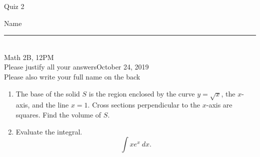 \documentclass[12pt]{article}
\begin{document}
\begin{flushleft} 
\centerline{\LARGE{Quiz 2}} 
\vspace{5 mm}
{Name \rule {2 in}{0.01in}}\\
Math 2B, 12PM
\\
{Please justify all your answers}\hfill {October 24, 2019}
\\
{Please also write your full name on the back} 

\medskip
\end{flushleft}
\begin{enumerate}
	\item The base of the solid $S$ is the region enclosed by the curve $y = \sqrt{x}$, the $x$-axis, and the line $x = 1$. Cross sections perpendicular to the $x$-axis are squares. Find the volume of $S$.
	\vfill
	\item Evaluate the integral.
	\[
	\int xe^x\ dx.
	\]
	\vfill\null
\end{enumerate}


\end{document}
